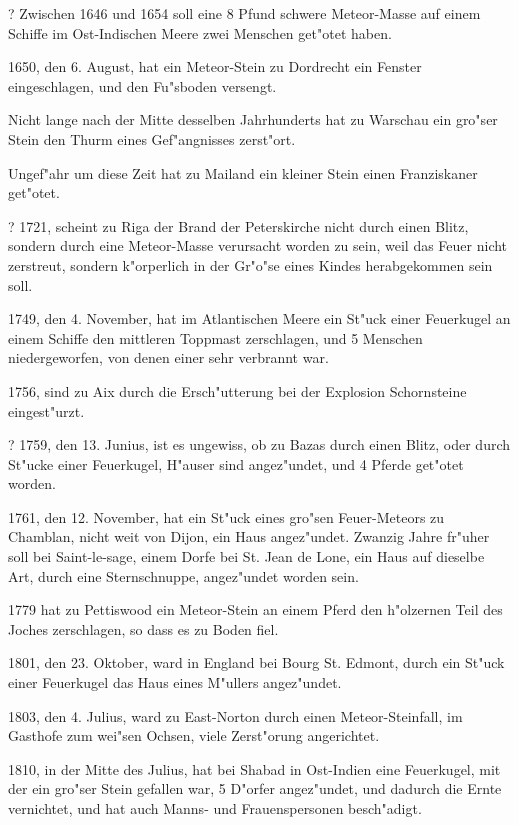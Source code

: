 \documentclass[a4paper, 11pt, oneside, polutonikogreek, german]{article}
\begin{document}
? Zwischen 1646 und 1654 soll eine 8 Pfund schwere Meteor-Masse auf einem Schiffe im Ost-Indischen Meere zwei Menschen get"otet haben.

1650, den 6. August, hat ein Meteor-Stein zu Dordrecht ein Fenster eingeschlagen, und den Fu"sboden versengt.

Nicht lange nach der Mitte desselben Jahrhunderts hat zu Warschau ein gro"ser Stein den Thurm eines Gef"angnisses zerst"ort.

Ungef"ahr um diese Zeit hat zu Mailand ein kleiner Stein einen Franziskaner get"otet.

? 1721, scheint zu Riga der Brand der Peterskirche nicht durch einen Blitz, sondern durch eine Meteor-Masse verursacht worden zu sein, weil das Feuer nicht zerstreut, sondern k"orperlich in der Gr"o"se eines Kindes herabgekommen sein soll.

1749, den 4. November, hat im Atlantischen Meere ein St"uck einer Feuerkugel an einem Schiffe den mittleren Toppmast zerschlagen, und 5 Menschen niedergeworfen, von denen einer sehr verbrannt war.

1756, sind zu Aix durch die Ersch"utterung bei der Explosion Schornsteine eingest"urzt.

? 1759, den 13. Junius, ist es ungewiss, ob zu Bazas durch einen Blitz, oder durch St"ucke einer Feuerkugel, H"auser sind angez"undet, und 4 Pferde get"otet worden.

1761, den 12. November, hat ein St"uck eines gro"sen Feuer-Meteors zu Chamblan, nicht weit von Dijon, ein Haus angez"undet. Zwanzig Jahre fr"uher soll bei Saint-le-sage, einem Dorfe bei St. Jean de Lone, ein Haus auf dieselbe Art, durch eine Sternschnuppe, angez"undet worden sein.

1779 hat zu Pettiswood ein Meteor-Stein an einem Pferd den h"olzernen Teil des Joches zerschlagen, so dass es zu Boden fiel.

1801, den 23. Oktober, ward in England bei Bourg St. Edmont, durch ein St"uck einer Feuerkugel das Haus eines M"ullers angez"undet.

1803, den 4. Julius, ward zu East-Norton durch einen Meteor-Steinfall, im Gasthofe zum wei"sen Ochsen, viele Zerst"orung angerichtet.

1810, in der Mitte des Julius, hat bei Shabad in Ost-Indien eine Feuerkugel, mit der ein gro"ser Stein gefallen war, 5 D"orfer angez"undet, und dadurch die Ernte vernichtet, und hat auch Manns- und Frauenspersonen besch"adigt.
\subsection{}
\end{document}

